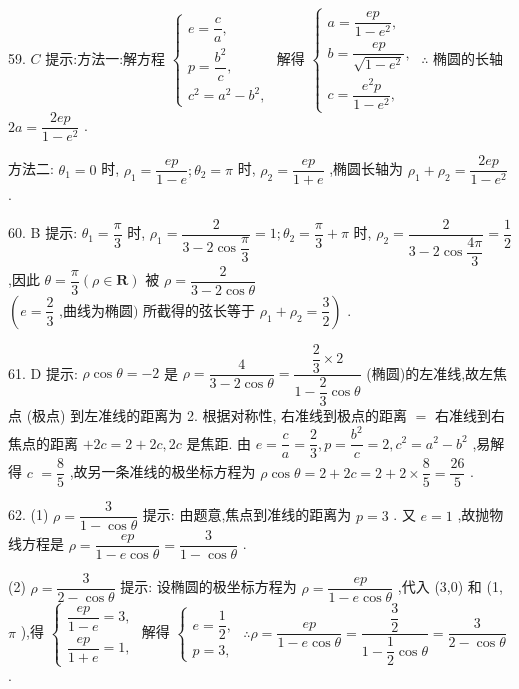 59. $C$ 提示:方法一:解方程 $\left\{  \begin{array}{l} e = \dfrac{c}{a}, \\  p = \dfrac{{b}^{2}}{c}, \\  {c}^{2} = {a}^{2} - {b}^{2}, \end{array}\right.$ 解得 $\left\{  \begin{array}{l} a = \dfrac{ep}{1 - {e}^{2}}, \\  b = \dfrac{ep}{\sqrt{1 - {e}^{2}}}, \\  c = \dfrac{{e}^{2}p}{1 - {e}^{2}}, \end{array}\right. \;\therefore$ 椭圆的长轴 ${2a} = \dfrac{2ep}{1 - {e}^{2}}$ .

方法二: ${\theta }_{1} = 0$ 时, ${\rho }_{1} = \dfrac{ep}{1 - e};{\theta }_{2} = \pi$ 时, ${\rho }_{2} = \dfrac{ep}{1 + e}$ ,椭圆长轴为 ${\rho }_{1} + {\rho }_{2} = \dfrac{2ep}{1 - {e}^{2}}$ .

60. B 提示: ${\theta }_{1} = \dfrac{\pi }{3}$ 时, ${\rho }_{1} = \dfrac{2}{3 - 2\cos \dfrac{\pi }{3}} = 1;{\theta }_{2} = \dfrac{\pi }{3} + \pi$ 时, ${\rho }_{2} = \dfrac{2}{3 - 2\cos \dfrac{4\pi }{3}} = \dfrac{1}{2}$ ,因此 $\theta  = \dfrac{\pi }{3}\left( {\rho  \in  \mathbf{R}}\right)$ 被 $\rho  = \dfrac{2}{3 - 2\cos \theta }$  $\left( {e = \dfrac{2}{3}\text{ ,曲线为椭圆) 所截得的弦长等于 }{\rho }_{1} + {\rho }_{2} = \dfrac{3}{2}}\right)$ .

61. D 提示: $\rho \cos \theta  =  - 2$ 是 $\rho  = \dfrac{4}{3 - 2\cos \theta } = \dfrac{\dfrac{2}{3} \times  2}{1 - \dfrac{2}{3}\cos \theta }$ (椭圆)的左准线,故左焦点 (极点) 到左准线的距离为 2. 根据对称性, 右准线到极点的距离 $=$ 右准线到右焦点的距离 $+ {2c} = 2 + {2c},{2c}$ 是焦距. 由 $e = \dfrac{c}{a} = \dfrac{2}{3},p = \dfrac{{b}^{2}}{c} = 2,{c}^{2} = {a}^{2} - {b}^{2}$ ,易解得 $c$  $= \dfrac{8}{5}$ ,故另一条准线的极坐标方程为 $\rho \cos \theta  = 2 + {2c} = 2 + 2 \times  \dfrac{8}{5} = \dfrac{26}{5}$ .

62. (1) $\rho  = \dfrac{3}{1 - \cos \theta }$ 提示: 由题意,焦点到准线的距离为 $p = 3$ . 又 $e = 1$ ,故抛物线方程是 $\rho  = \dfrac{ep}{1 - e\cos \theta } = \dfrac{3}{1 - \cos \theta }$ .

(2) $\rho  = \dfrac{3}{2 - \cos \theta }$ 提示: 设椭圆的极坐标方程为 $\rho  = \dfrac{ep}{1 - e\cos \theta }$ ,代入 (3,0) 和 (1, $\pi$ ),得 $\left\{  \begin{array}{l} \dfrac{ep}{1 - e} = 3, \\  \dfrac{ep}{1 + e} = 1, \end{array}\right.$ 解得 $\left\{  \begin{array}{l} e = \dfrac{1}{2}, \\  p = 3, \end{array}\right.$  $\therefore \rho  = \dfrac{ep}{1 - e\cos \theta } = \dfrac{\dfrac{3}{2}}{1 - \dfrac{1}{2}\cos \theta } = \dfrac{3}{2 - \cos \theta }$ .

